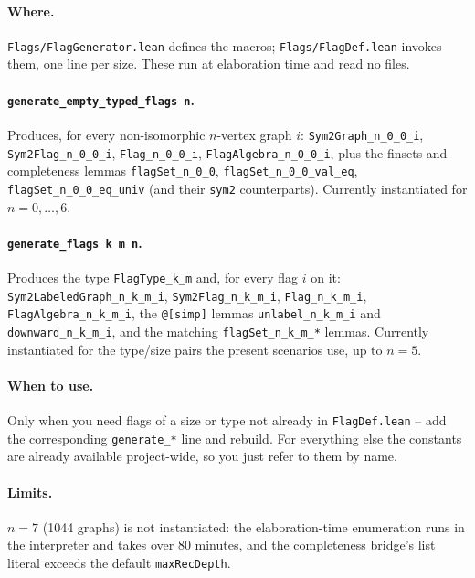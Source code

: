 \documentclass[11pt]{article}
\begin{document}
\paragraph{Where.} \texttt{Flags/FlagGenerator.lean} defines the macros;
\texttt{Flags/FlagDef.lean} invokes them, one line per size. These run at
elaboration time and read no files.

\paragraph{\texttt{generate\_empty\_typed\_flags n}.} Produces, for every
non-isomorphic $n$-vertex graph $i$: \texttt{Sym2Graph\_n\_0\_0\_i},
\texttt{Sym2Flag\_n\_0\_0\_i}, \texttt{Flag\_n\_0\_0\_i},
\texttt{FlagAlgebra\_n\_0\_0\_i}, plus the finsets and completeness lemmas
\texttt{flagSet\_n\_0\_0}, \texttt{flagSet\_n\_0\_0\_val\_eq},
\texttt{flagSet\_n\_0\_0\_eq\_univ} (and their \texttt{sym2} counterparts).
Currently instantiated for $n = 0,\dots,6$.

\paragraph{\texttt{generate\_flags k m n}.} Produces the type
\texttt{FlagType\_k\_m} and, for every flag $i$ on it:
\texttt{Sym2LabeledGraph\_n\_k\_m\_i}, \texttt{Sym2Flag\_n\_k\_m\_i},
\texttt{Flag\_n\_k\_m\_i}, \texttt{FlagAlgebra\_n\_k\_m\_i}, the
\texttt{@[simp]} lemmas \texttt{unlabel\_n\_k\_m\_i} and
\texttt{downward\_n\_k\_m\_i}, and the matching \texttt{flagSet\_n\_k\_m\_*}
lemmas. Currently instantiated for the type/size pairs the present
scenarios use, up to $n = 5$.

\paragraph{When to use.} Only when you need flags of a size or type not
already in \texttt{FlagDef.lean} -- add the corresponding
\texttt{generate\_*} line and rebuild. For everything else the constants
are already available project-wide, so you just refer to them by name.

\paragraph{Limits.} $n = 7$ (1044 graphs) is not instantiated: the
elaboration-time enumeration runs in the interpreter and takes over 80
minutes, and the completeness bridge's list literal exceeds the default
\texttt{maxRecDepth}.
\end{document}
